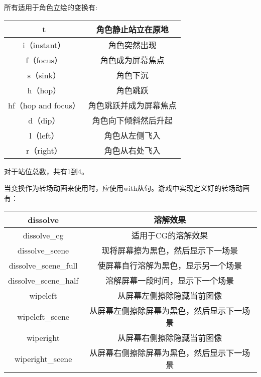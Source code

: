 所有适用于角色立绘的变换有:

\begin{center}
    \tabletail{\hline}
    \tablelasttail{\hline}
    \begin{supertabular}{|c|c|}
        \hline
        t & 角色静止站立在原地 \\
        \hline
        i（instant） & 角色突然出现 \\
        \hline
        f（focus） & 角色成为屏幕焦点 \\
        \hline
        s（sink） & 角色下沉 \\
        \hline
        h（hop） & 角色跳跃 \\
        \hline
        hf（hop and focus） & 角色跳跃并成为屏幕焦点 \\
        \hline
        d（dip） & 角色向下倾斜然后升起 \\
        \hline
        l（left） & 角色从左侧飞入 \\
        \hline
        r（right） & 角色从右处飞入 \\
        \hline
    \end{supertabular}
\end{center}

对于站位总数，共有1到4。

当变换作为转场动画来使用时，应使用with从句。游戏中实现定义好的转场动画有：

\begin{center}
    \tabletail{\hline}
    \tablelasttail{\hline}
    \begin{supertabular}{|c|c|}
        \hline
        dissolve & 溶解效果 \\
        \hline
        dissolve\_cg & 适用于CG的溶解效果 \\
        \hline
        dissolve\_scene & 现将屏幕擦为黑色，然后显示下一场景 \\
        \hline
        dissolve\_scene\_full & 使屏幕自行溶解为黑色，显示另一个场景 \\
        \hline
        dissolve\_scene\_half & 溶解屏幕一段时间，显示下一个场景 \\
        \hline
        wipeleft & 从屏幕左侧擦除隐藏当前图像 \\
        \hline
        wipeleft\_scene & 从屏幕左侧擦除屏幕为黑色，然后显示下一场景 \\
        \hline
        wiperight & 从屏幕右侧擦除隐藏当前图像 \\
        \hline
        wiperight\_scene & 从屏幕右侧擦除屏幕为黑色，然后显示下一场景 \\
        \hline
    \end{supertabular}
\end{center}


